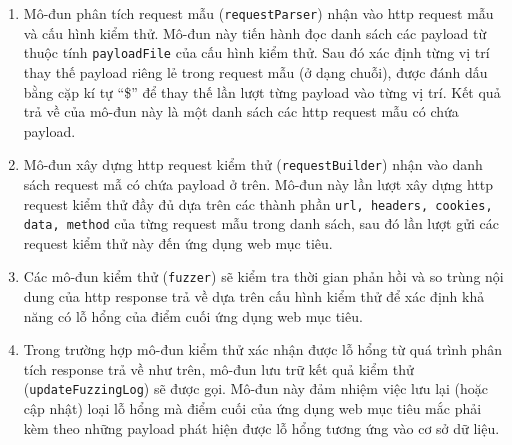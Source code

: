 \begin{enumerate}
    \item Mô-đun phân tích request mẫu (\texttt{requestParser}) nhận vào \acrshort{http} request mẫu và cấu hình kiểm thử. Mô-đun này tiến hành đọc danh sách các payload từ thuộc tính \texttt{payloadFile} của cấu hình kiểm thử. Sau đó xác định từng vị trí thay thế payload riêng lẻ trong request mẫu (ở dạng chuỗi), được đánh dấu bằng cặp kí tự ``\$'' để thay thế lần lượt từng payload vào từng vị trí. Kết quả trả về của mô-đun này là một danh sách các \acrshort{http} request mẫu có chứa payload.
    \item Mô-đun xây dựng \acrshort{http} request kiểm thử (\texttt{requestBuilder}) nhận vào danh sách request mẫ có chứa payload ở trên. Mô-đun này lần lượt xây dựng \acrshort{http} request kiểm thử đầy đủ dựa trên các thành phần \texttt{url, headers, cookies, data, method} của từng request mẫu trong danh sách, sau đó lần lượt gửi các request kiểm thử này đến ứng dụng web mục tiêu.
    \item Các mô-đun kiểm thử (\texttt{fuzzer}) sẽ kiểm tra thời gian phản hồi và so trùng nội dung của \acrshort{http} response trả về dựa trên cấu hình kiểm thử để xác định khả năng có lỗ hổng của điểm cuối ứng dụng web mục tiêu. 
    \item Trong trường hợp mô-đun kiểm thử xác nhận được lỗ hổng từ quá trình phân tích response trả về như trên, mô-đun lưu trữ kết quả kiểm thử (\texttt{updateFuzzingLog}) sẽ được gọi. Mô-đun này đảm nhiệm việc lưu lại (hoặc cập nhật) loại lỗ hổng mà điểm cuối của ứng dụng web mục tiêu mắc phải kèm theo những payload phát hiện được lỗ hổng tương ứng vào cơ sở dữ liệu.
\end{enumerate}

